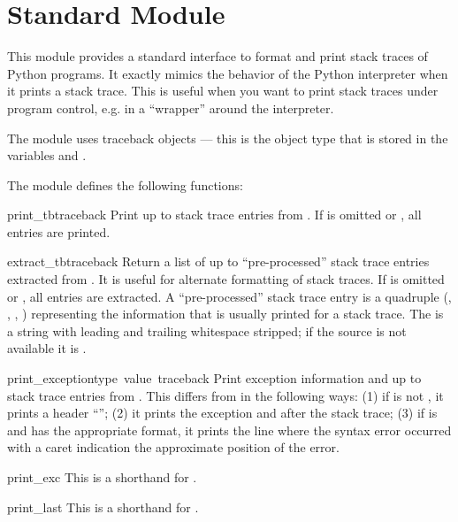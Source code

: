 \section{Standard Module }
\label{module-traceback}


This module provides a standard interface to format and print stack
traces of Python programs.  It exactly mimics the behavior of the
Python interpreter when it prints a stack trace.  This is useful when
you want to print stack traces under program control, e.g. in a
``wrapper'' around the interpreter.

The module uses traceback objects --- this is the object type
that is stored in the variables  and
.

The module defines the following functions:

\begin{funcdesc}{print_tb}{traceback}
Print up to  stack trace entries from .  If
 is omitted or , all entries are printed.
\end{funcdesc}

\begin{funcdesc}{extract_tb}{traceback}
Return a list of up to  ``pre-processed'' stack trace
entries extracted from .  It is useful for alternate
formatting of stack traces.  If  is omitted or ,
all entries are extracted.  A ``pre-processed'' stack trace entry is a
quadruple (, , ,
) representing the information that is usually printed
for a stack trace.  The  is a string with leading and
trailing whitespace stripped; if the source is not available it is
.
\end{funcdesc}

\begin{funcdesc}{print_exception}{type\, value\, traceback}
Print exception information and up to  stack trace entries
from .  This differs from  in the
following ways: (1) if  is not , it prints a
header ``''; (2) it prints the
exception  and  after the stack trace; (3) if
 is  and  has the appropriate
format, it prints the line where the syntax error occurred with a
caret indication the approximate position of the error.
\end{funcdesc}

\begin{funcdesc}{print_exc}{}
This is a shorthand for 
  .
\end{funcdesc}

\begin{funcdesc}{print_last}{}
This is a shorthand for 
  .
\end{funcdesc}
